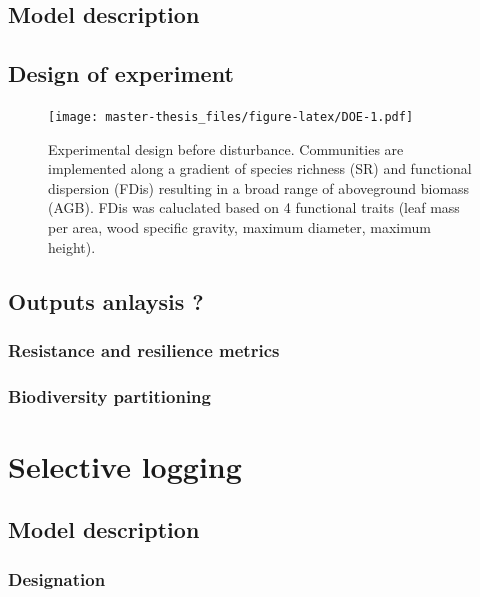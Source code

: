 \documentclass[]{article}
\theoremstyle{definition}
\theoremstyle{definition}
\theoremstyle{remark}
\begin{document}
\subsection{Model description}\label{model-description-1}

\subsection{Design of experiment}\label{design-of-experiment}

\begin{figure}[htbp]
\centering
\texttt{[image: master-thesis\_files/figure-latex/DOE-1.pdf]}
\caption{\label{fig:DOE}Experimental design before disturbance. Communities
are implemented along a gradient of species richness (SR) and functional
dispersion (FDis) resulting in a broad range of aboveground biomass
(AGB). FDis was caluclated based on 4 functional traits (leaf mass per
area, wood specific gravity, maximum diameter, maximum height).}
\end{figure}

\subsection{Outputs anlaysis ?}\label{outputs-anlaysis}

\subsubsection{Resistance and resilience
metrics}\label{resistance-and-resilience-metrics}

\subsubsection{Biodiversity
partitioning}\label{biodiversity-partitioning}

\section{Selective logging}\label{selective-logging}

\subsection{Model description}\label{model-description-2}

\subsubsection{Designation}\label{designation}
\end{document}
